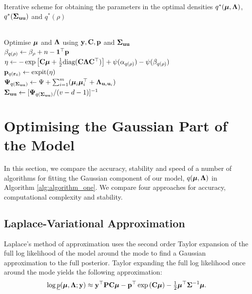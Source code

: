 \documentclass{amsart}[12pt]
\begin{document}
\begin{algorithm}
	\caption[Algorithm 1]{Iterative scheme for obtaining the parameters in the
		optimal densities $q^*({\boldsymbol \mu}, {\boldsymbol \Lambda})$, $q^*({\boldsymbol \Sigma}_{{\bf u} {\bf u}})$ and $q^*(\rho)$}
	\label{alg:algorithm_one}
	\begin{algorithmic}
		 \\[1ex]
		\STATE Optimise ${\boldsymbol \mu}$ and ${\boldsymbol \Lambda}$ using ${\bf y}, {\bf C}, {\bf p}$ and ${\boldsymbol \Sigma}_{{\bf u} {\bf u}}$ \\[1ex]
		\STATE $\beta_{q(\rho)} \leftarrow \beta_\rho + n - {\bf 1}^\top{\bf p}$ \\[1ex]
		\STATE $\eta \leftarrow -\exp \left [ {\bf C} {\boldsymbol \mu} + \tfrac{1}{2} \text{diag}{({\bf C}{\boldsymbol\Lambda}{\bf C}^\top)} \right ] + \psi{(\alpha_{q{(\rho)}})} - \psi{(\beta_{q{(\rho)}})}$ \\[1ex]
			\STATE ${\bf p}_{q({\bf r}_0)} \leftarrow \text{expit} (\eta)$ \\[1ex]
			\STATE ${\boldsymbol \Psi}_{q({\boldsymbol \Sigma}_{{\bf u} {\bf u}})} \leftarrow \Psi + \sum_{i=1}^m ({\boldsymbol \mu}_i {\boldsymbol \mu}_i^\top + {\boldsymbol \Lambda}_{{{\bf u}}_i {{\bf u}}_i})$ \\[1ex]
			\STATE ${\boldsymbol \Sigma}_{{\bf u}{\bf u}} \leftarrow [{\boldsymbol \Psi}_{q({\boldsymbol \Sigma}_{{\bf u} {\bf u}})}/(v - d - 1)]^{-1}$
			\ENDWHILE
			\end{algorithmic}
			\end{algorithm}
						
			\section{Optimising the Gaussian Part of the Model}
			\label{sec:gaussian}
					
			In this section, we compare the accuracy, stability and speed of a number of algorithms for fitting the
			Gaussian component of our model, $q({\boldsymbol \mu}, {\boldsymbol \Lambda})$ in Algorithm \ref{alg:algorithm_one}.  We compare four
			approaches for accuracy, computational complexity and stability.
				
			\subsection{Laplace-Variational Approximation}
					
			Laplace's method of approximation uses the second order Taylor expansion of the full log likelihood of the 
			model around the mode to find a Gaussian approximation to the full posterior. Taylor expanding the full log likelihood once around the mode yields the following approximation:
			\begin{align*}
				\log \underline{p}({\boldsymbol \mu}, {\boldsymbol \Lambda}; {\bf y}) \approx {\bf y}^\top{\bf P}{\bf C}{\boldsymbol\mu} - {\bf p}^\top\exp \left ({\bf C} {\boldsymbol \mu} \right ) - \tfrac{1}{2} {\boldsymbol \mu}^\top {\boldsymbol\Sigma}^{-1} {\boldsymbol \mu}. 
			\end{align*}
					
\end{document}
